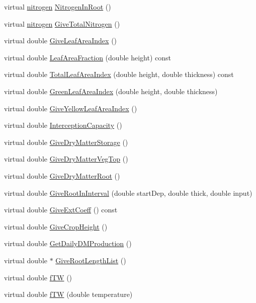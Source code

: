 \begin{DoxyCompactItemize}
virtual \hyperlink{classnitrogen}{nitrogen} \hyperlink{classcrop_ad0404629e0ae80c88ae7b99ff50cfdca}{NitrogenInRoot} ()
\item 
virtual \hyperlink{classnitrogen}{nitrogen} \hyperlink{classcrop_a0d276aec35091a517cc117546cf8c9f9}{GiveTotalNitrogen} ()
\item 
virtual double \hyperlink{classcrop_aa94e2f14b2e8e72c893ab67ad1123e14}{GiveLeafAreaIndex} ()
\item 
virtual double \hyperlink{classcrop_a8e4c60317adb0f14a2f21462c2eb9a6c}{LeafAreaFraction} (double height) const 
\item 
virtual double \hyperlink{classcrop_aef3e13efa427477cd8ce5aa070c3e2cb}{TotalLeafAreaIndex} (double height, double thickness) const 
\item 
virtual double \hyperlink{classcrop_a5c3e9f999f957f7bebe6cca43f569eab}{GreenLeafAreaIndex} (double height, double thickness)
\item 
virtual double \hyperlink{classcrop_a86c3888357b5ca286bfaede7fa64c1e4}{GiveYellowLeafAreaIndex} ()
\item 
virtual double \hyperlink{classcrop_aa0e3e053a447eb7b6389099e9e93e672}{InterceptionCapacity} ()
\item 
virtual double \hyperlink{classcrop_ab8db7f88fbd260a4e8b7dbb735490753}{GiveDryMatterStorage} ()
\item 
virtual double \hyperlink{classcrop_a8442897ed98c68b6821a17ce3adc38e8}{GiveDryMatterVegTop} ()
\item 
virtual double \hyperlink{classcrop_aceebd864d8c9058698b7f93ae413c45d}{GiveDryMatterRoot} ()
\item 
virtual double \hyperlink{classcrop_a45017219012e2e4865e53c406ca32756}{GiveRootInInterval} (double startDep, double thick, double input)
\item 
virtual double \hyperlink{classcrop_aa3ce4d26c1cdce101dfe72adc793ebf2}{GiveExtCoeff} () const 
\item 
virtual double \hyperlink{classcrop_a75948813cda562087a4ba9474a5906c6}{GiveCropHeight} ()
\item 
virtual double \hyperlink{classcrop_a481d40295898bbc66581b5bc0849de75}{GetDailyDMProduction} ()
\item 
virtual double $\ast$ \hyperlink{classcrop_a17c3bc93f8a3a6c784f9e30e9d17fbef}{GiveRootLengthList} ()
\item 
virtual double \hyperlink{classcrop_a9ff0b086b54afd4c235cb80a9a080d05}{fTW} ()
\item 
virtual double \hyperlink{classcrop_a4697bfc911fdbf7ffb8c8bc5af5eaaeb}{fTW} (double temperature)

\end{DoxyCompactItemize}
